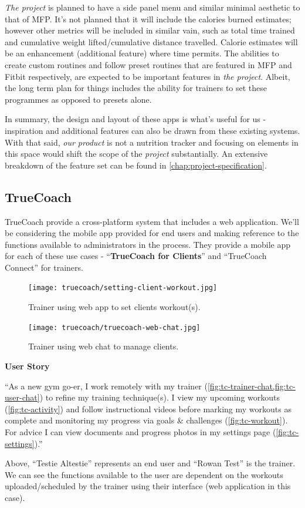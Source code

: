 \textit{The project} 
is planned to have a side panel menu and similar minimal aesthetic to that of MFP.
It's not planned that it will include the calories burned estimates; however other metrics will be included in similar vain, such
as total time trained and cumulative weight lifted/cumulative distance travelled. Calorie estimates will be an enhancement (additional feature) where time permits.
The abilities to create custom routines and follow preset routines that are featured in MFP and Fitbit respectively,
are expected to be important features in \textit{the project}. Albeit, the long term plan for
things includes the ability for trainers to set these programmes as opposed to presets alone. 
\par
In summary, the design
and layout of these apps is what's useful for us - inspiration and additional features can also be drawn
from these existing systems. With that said, \textit{our product} is not a nutrition tracker and focusing
on elements in this space would shift the scope of the \textit{project} substantially. An extensive
breakdown of the feature set can be found in \cref{chap:project-specification}.
\pagebreak
\subsection{TrueCoach}
TrueCoach provide a cross-platform system that includes a web application.
We'll be considering the mobile app provided for end users and making reference
to the functions available to administrators in the process. They provide a mobile app
for each of these use cases - ``\textbf{TrueCoach for Clients}'' and ``TrueCoach Connect'' for trainers.
\begin{figure}[H]
	\centering
	\texttt{[image: truecoach/setting-client-workout.jpg]}
	\caption{Trainer using web app to set clients workout(s).}
	\vspace*{-5mm}
	\label{fig:tc-trainer-set}
\end{figure}
\begin{figure}[H]
	\centering
	\texttt{[image: truecoach/truecoach-web-chat.jpg]}
	\caption{Trainer using web chat to manage clients.}
	\vspace*{-5mm}
	\label{fig:tc-trainer-chat}
\end{figure}
\textbf{User Story}
\label{research-breakdown:tc-usr-story}
\par
``As a new gym go-er, I work remotely with my trainer (\cref{fig:tc-trainer-chat,fig:tc-user-chat}) to refine my training technique(s).
I view my upcoming workouts (\cref{fig:tc-activity}) and follow instructional videos before marking my workouts as complete and monitoring 
my progress via goals \& challenges (\cref{fig:tc-workout}). For advice I can view
documents and progress photos in my settings page (\cref{fig:tc-settings}).''

\vspace*{-5mm}

Above, ``Testie Altestie'' represents an end user and ``Rowan Test'' is the trainer. We can see
the functions available to the user are dependent on the workouts uploaded/scheduled
by the trainer using their interface (web application in this case).
\pagebreak

